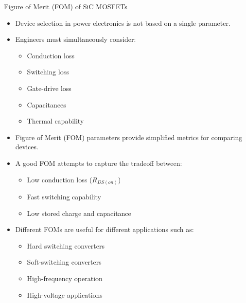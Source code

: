 \begin{frame}{Figure of Merit (FOM) of SiC MOSFETs}
\begin{itemize}
    \item Device selection in power electronics is not based on a single parameter.
    \item Engineers must simultaneously consider:
    \begin{itemize}
        \item Conduction loss
        \item Switching loss
        \item Gate-drive loss
        \item Capacitances
        \item Thermal capability
    \end{itemize}
    \item Figure of Merit (FOM) parameters provide simplified metrics for comparing devices.
    \item A good FOM attempts to capture the tradeoff between:
    \begin{itemize}
        \item Low conduction loss ($R_{DS(on)}$)
        \item Fast switching capability
        \item Low stored charge and capacitance
    \end{itemize}
    \item Different FOMs are useful for different applications such as:
    \begin{itemize}
        \item Hard switching converters
        \item Soft-switching converters
        \item High-frequency operation
        \item High-voltage applications
    \end{itemize}
\end{itemize}
\end{frame}



